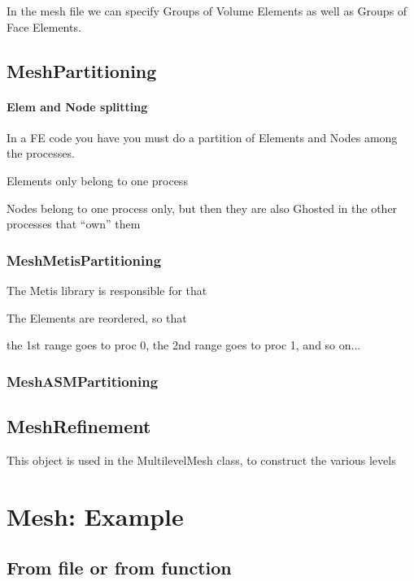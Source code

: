 \documentclass[10pt]{book}
\begin{document}
    In the mesh file we can specify Groups of Volume Elements as well as Groups of Face Elements.
    
    
    
  \section{MeshPartitioning}
  
  
  \subsubsection{Elem and Node splitting}
 
 In a FE code you have you must do a partition of Elements and Nodes among the processes.

 Elements only belong to one process
 
 Nodes belong to one process only, but then they are also Ghosted in the other processes that ``own'' them
 
 
 
 
    \subsection{MeshMetisPartitioning}

  The Metis library is responsible for that

  
  The Elements are reordered, so that 
  
  the 1st range goes to proc 0, the 2nd range goes to proc 1, and so on...
  
  
    \subsection{MeshASMPartitioning}
  

  
  \section{MeshRefinement}

   
    This object is used in the MultilevelMesh class, to construct the various levels
  
 \chapter{Mesh: Example}
 
   \section{From file or from function}
   
\end{document}
